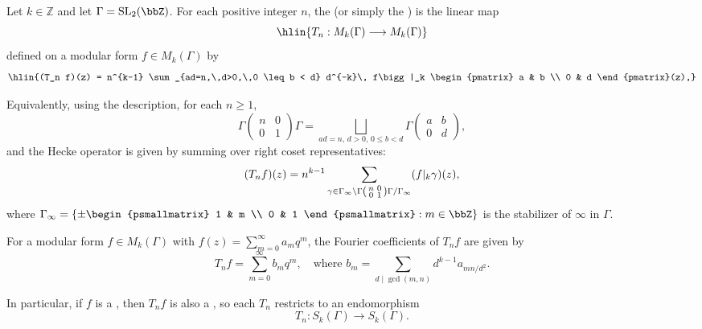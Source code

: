 \begin{definition} \label{definition:hecke_operator_on_modular_forms_for_SL_2_Z}
Let $k \in \mathbb{Z}$ and let $\Gamma = \mathrm{SL}_2(\bbZ)$. For each positive integer $n$, the  (or simply the ) is the linear map
$$\hlin{T_n : M_k(\Gamma) \longrightarrow M_k(\Gamma)}$$
defined on a modular form $f \in M_k(\Gamma)$ by
$$\hlin{(T_n f)(z) = n^{k-1} \sum_{ad=n,\,d>0,\,0 \leq b < d} d^{-k}\, f\bigg|_k \begin{pmatrix} a & b \\ 0 & d \end{pmatrix}(z),}$$

Equivalently, using the  description, for each $n \geq 1$,
$$\Gamma \begin{pmatrix} n & 0 \\ 0 & 1 \end{pmatrix} \Gamma = \bigsqcup_{ad=n,\,d>0,\,0 \leq b < d} \Gamma \begin{pmatrix} a & b \\ 0 & d \end{pmatrix},$$
and the Hecke operator is given by summing over right coset representatives:
$$(T_n f)(z) = n^{k-1} \sum_{\gamma \in \Gamma_\infty \backslash \Gamma \begin{psmallmatrix} n & 0 \\ 0 & 1 \end{psmallmatrix} \Gamma / \Gamma_\infty} (f|_k \gamma)(z),$$
where $\Gamma_\infty = \left\{ \pm \begin{psmallmatrix} 1 & m \\ 0 & 1 \end{psmallmatrix} : m \in \bbZ \right\}$ is the stabilizer of $\infty$ in $\Gamma$.

For a modular form $f \in M_k(\Gamma)$ with  $f(z) = \sum_{m=0}^\infty a_m q^m$, the Fourier coefficients of $T_n f$ are given by
$$T_n f = \sum_{m=0}^\infty b_m q^m, \quad \text{where } b_m = \sum_{d \mid \gcd(m,n)} d^{k-1} a_{mn/d^2}.$$

In particular, if $f$ is a , then $T_n f$ is also a , so each $T_n$ restricts to an endomorphism 
$$T_n: S_k(\Gamma) \to S_k(\Gamma).$$

\end{definition}
